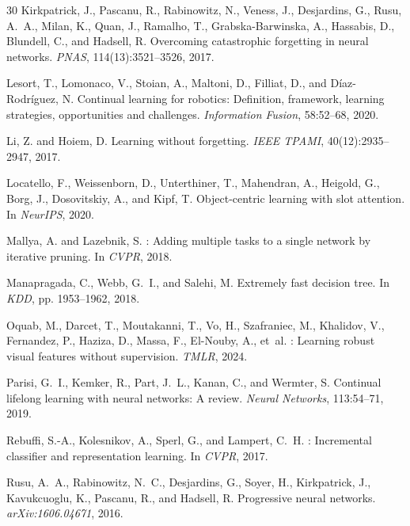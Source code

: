 \documentclass{article}
\begin{document}
\begin{thebibliography}{30}
Kirkpatrick, J., Pascanu, R., Rabinowitz, N., Veness, J., Desjardins, G., Rusu, A.~A., Milan, K., Quan, J., Ramalho, T., Grabska-Barwinska, A., Hassabis, D., Blundell, C., and Hadsell, R.
\newblock Overcoming catastrophic forgetting in neural networks.
\newblock \emph{PNAS}, 114(13):3521--3526, 2017.

Lesort, T., Lomonaco, V., Stoian, A., Maltoni, D., Filliat, D., and D\'{i}az-Rodr\'{i}guez, N.
\newblock Continual learning for robotics: Definition, framework, learning strategies, opportunities and challenges.
\newblock \emph{Information Fusion}, 58:52--68, 2020.

Li, Z. and Hoiem, D.
\newblock Learning without forgetting.
\newblock \emph{IEEE TPAMI}, 40(12):2935--2947, 2017.

Locatello, F., Weissenborn, D., Unterthiner, T., Mahendran, A., Heigold, G., Borg, J., Dosovitskiy, A., and Kipf, T.
\newblock Object-centric learning with slot attention.
\newblock In \emph{NeurIPS}, 2020.

Mallya, A. and Lazebnik, S.
: Adding multiple tasks to a single network by iterative pruning.
\newblock In \emph{CVPR}, 2018.

Manapragada, C., Webb, G.~I., and Salehi, M.
\newblock Extremely fast decision tree.
\newblock In \emph{KDD}, pp. 1953--1962, 2018.

Oquab, M., Darcet, T., Moutakanni, T., Vo, H., Szafraniec, M., Khalidov, V., Fernandez, P., Haziza, D., Massa, F., El-Nouby, A., et~al.
: Learning robust visual features without supervision.
\newblock \emph{TMLR}, 2024.

Parisi, G.~I., Kemker, R., Part, J.~L., Kanan, C., and Wermter, S.
\newblock Continual lifelong learning with neural networks: A review.
\newblock \emph{Neural Networks}, 113:54--71, 2019.

Rebuffi, S.-A., Kolesnikov, A., Sperl, G., and Lampert, C.~H.
: Incremental classifier and representation learning.
\newblock In \emph{CVPR}, 2017.

Rusu, A.~A., Rabinowitz, N.~C., Desjardins, G., Soyer, H., Kirkpatrick, J., Kavukcuoglu, K., Pascanu, R., and Hadsell, R.
\newblock Progressive neural networks.
\newblock \emph{arXiv:1606.04671}, 2016.


\end{thebibliography}
\end{document}
